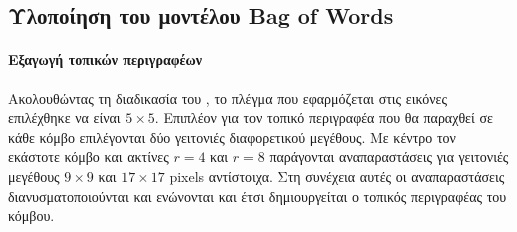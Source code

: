 
\subsection{Υλοποίηση του μοντέλου Bag of Words}

\paragraph*{Εξαγωγή τοπικών περιγραφέων}
Ακολουθώντας τη διαδικασία του \cite{sundb}, το πλέγμα που εφαρμόζεται στις εικόνες επιλέχθηκε να είναι $5\times5$. Επιπλέον για τον τοπικό περιγραφέα που θα παραχθεί σε κάθε κόμβο επιλέγονται δύο γειτονιές διαφορετικού μεγέθους. Με κέντρο τον εκάστοτε κόμβο και ακτίνες $r = 4$ και $r = 8$ παράγονται αναπαραστάσεις για γειτονιές μεγέθους $9\times9$ και $17\times17$ pixels αντίστοιχα. Στη συνέχεια αυτές οι αναπαραστάσεις διανυσματοποιούνται και ενώνονται και έτσι δημιουργείται ο τοπικός περιγραφέας του κόμβου.

%

